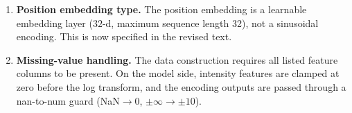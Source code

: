 \begin{enumerate}
    \item \textbf{Position embedding type.} The position embedding is a
    learnable embedding layer ($32$-d, maximum sequence length 32), not a
    sinusoidal encoding. This is now specified in the revised text.

    \item \textbf{Missing-value handling.} The data construction requires
    all listed feature columns to be present. On the model side, intensity
    features are clamped at zero before the log transform, and the encoding
    outputs are passed through a nan-to-num guard
    (NaN$\to$0, $\pm\infty\to\pm10$).
\end{enumerate}
